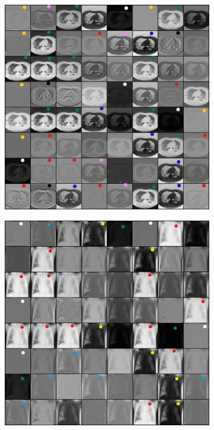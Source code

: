 \begin{figure}[h]
	\begin{center}
		\begin{subfigure}[b]{0.49\textwidth}
			\includegraphics[height= 0.25\textheight]{thesis-template-master/images/Inkedfirst Conv1 of resnet18 with pretrain weights on coviddataset_LI.jpg}
			\caption{}
			\label{fig:res18}
		\end{subfigure}
		
		
		\begin{subfigure}[b]{0.49\textwidth}
			\includegraphics[height= 0.25\textheight]{thesis-template-master/images/Inkedfirst Conv1 of resnet18 with pretrain weights on penudataset_LI.jpg}
			\caption{}
			\label{fig:cellnet}
		\end{subfigure}
		

\end{center}
\end{figure}
